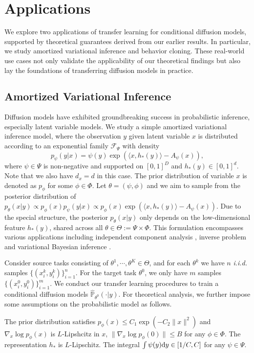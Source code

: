 \documentclass[11pt]{article}
\numberwithin{equation}{section}
\renewcommand{\P}{\mathbb{P}}
\begin{document}
\section{Applications}\label{sec:application}

We explore two applications of transfer learning for conditional diffusion models, supported by theoretical guarantees derived from our earlier results.
In particular, we study amortized variational inference and behavior cloning.
These real-world use cases not only validate the applicability of our theoretical findings but also lay the foundations of transferring diffusion models in practice.


\subsection{Amortized Variational Inference}

Diffusion models have exhibited groundbreaking success in probabilistic inference, especially latent variable models.
We study a simple amortized variational inference model, where the observation $y$ given latent variable $x$ is distributed according to an exponential family $\mathcal{F}_\Psi$ with density
\begin{equation}
    p_\psi(y|x)=\psi(y)\exp(\langle x, h_*(y)\rangle-A_\psi(x)),
\end{equation}
where $\psi\in\Psi$ is non-negative and supported on $[0,1]^{D}$ and $h_*(y)\in[0,1]^{d}$. 
Note that we also have $d_x=d$ in this case.
The prior distribution of variable $x$ is denoted as $p_\phi$ for some $\phi\in\Phi$. 
Let $\theta=(\psi,\phi)$ and we aim to sample from the posterior distribution of $p_\theta(x|y)\propto p_\phi(x)p_\psi(y|x)\propto p_\phi(x)\exp(\langle x, h_*(y)\rangle-A_\psi(x))$.
Due to the special structure, the posterior $p_\theta(x|y)$ only depends on the low-dimensional feature $h_*(y)$, shared across all $\theta\in\Theta:=\Psi\times\Phi$.
This formulation encompasses various applications including independent component analysis \citep{comon1994independent}, inverse problem \citep{song2021solving,ajay2022conditional} and variational Bayesian inference \citep{kingma2013auto}. 

Consider source tasks consisting of $\theta^1,\cdots,\theta^K\in\Theta$, and for each $\theta^k$ we have $n$ \textit{i.i.d.} samples $\{(x_i^k,y_i^k)\}_{i=1}^n$.
For the target task $\theta^0$, we only have $m$ samples $\{(x_i^0,y_i^0)\}_{i=1}^m$.
We conduct our transfer learning procedures to train a conditional diffusion models $\widehat{\P}_{\theta^0}(\cdot|y)$.
For theoretical analysis, we further impose some assumptions on the probabilistic model as follows.
\begin{asp}\label{asp:amortized_vi}
    The prior distribution satisfies $p_\phi(x)\leq C_1\exp(-C_2\|x\|^2)$ and $\nabla_x \log p_\phi(x)$ is $L$-Lipshcitz in $x$, $\|\nabla_x \log p_\phi(0)\|\leq B$ for any $\phi\in\Phi$.
    The representation $h_*$ is $L$-Lipschitz.
    The integral $\int \psi(y)\mathrm{d} y\in [1/C, C]$ for any $\psi\in\Psi$.
\end{asp}
\end{document}
